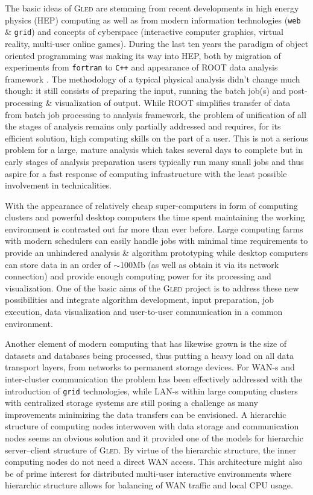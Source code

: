 \documentclass[a4paper,11pt]{article}
\def\gled{\textsc{Gled}\xspace}
\def\grid{\texttt{grid}\xspace}
\def\smalltt#1{{\small\texttt{#1}}}
\begin{document}
The basic ideas of \gled are stemming from recent developments in high
energy physics (HEP) computing as well as from modern information
technologies (\texttt{web} \& \texttt{grid}) and concepts of
cyberspace (interactive computer graphics, virtual reality, multi-user
online games). During the last ten years the paradigm of object oriented
programming was making its way into HEP, both by migration of
experiments from \smalltt{fortran} to \smalltt{C++} and appearance of
ROOT data analysis framework \cite{root}. The methodology of a typical
physical analysis didn't change much though: it still consists of
preparing the input, running the batch job(s) and post-processing \&
visualization of output. While ROOT simplifies transfer of data from
batch job processing to analysis framework, the problem of unification
of all the stages of analysis remains only partially addressed and
requires, for its efficient solution, high computing skills on the
part of a user. This is not a serious problem for a large, mature
analysis which takes several days to complete but in early stages of
analysis preparation users typically run many small jobs and thus
aspire for a fast response of computing infrastructure with the least
possible involvement in technicalities.

With the appearance of relatively cheap super-computers in form of
computing clusters and powerful desktop computers the time spent 
maintaining the working environment is contrasted out far more than
ever before. Large computing farms with modern schedulers can easily
handle jobs with minimal time requirements to provide an unhindered
analysis \& algorithm prototyping while desktop computers can store
data in an order of $\sim$100Mb (as well as obtain it via its network
connection) and provide enough computing power for its processing and
visualization. One of the basic aims of the \gled project is to
address these new possibilities and integrate algorithm development,
input preparation, job execution, data visualization and user-to-user
communication in a common environment.

Another element of modern computing that has likewise grown is the
size of datasets and databases being processed, thus putting a heavy
load on all data transport layers, from networks to permanent storage
devices. For WAN-s and inter-cluster communication the problem has
been effectively addressed with the introduction of \grid
technologies, while LAN-s within large computing clusters with
centralized storage systems are still posing a challenge as many
improvements minimizing the data transfers can be envisioned. A
hierarchic structure of computing nodes interwoven with data storage
and communication nodes seems an obvious solution and it provided one
of the models for hierarchic server--client structure of \gled. By
virtue of the hierarchic structure, the inner computing nodes do not
need a direct WAN access. This architecture might also be of prime
interest for distributed multi-user interactive environments where
hierarchic structure allows for balancing of WAN traffic and local CPU
usage.
\end{document}
